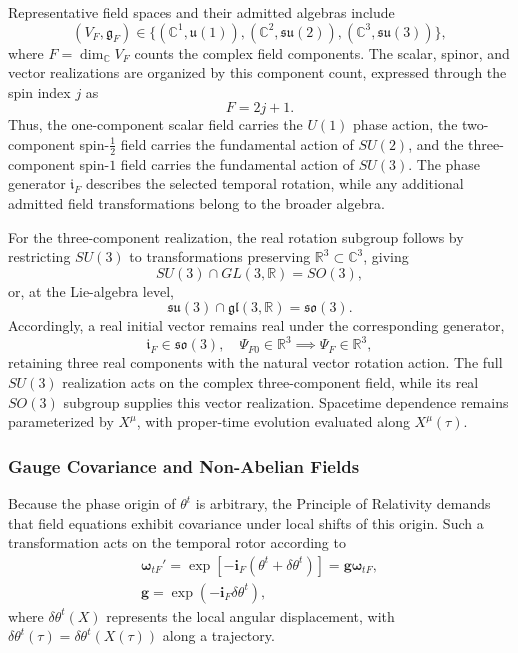 Representative field spaces and their admitted algebras include
\begin{equation}
    (V_{F},\mathfrak{g}_{F})\in\bigl\{(\mathbb{C}^{1},\mathfrak{u}(1)),(\mathbb{C}^{2},\mathfrak{su}(2)),(\mathbb{C}^{3},\mathfrak{su}(3))\bigr\},
\end{equation}
where $F=\dim_{\mathbb{C}}V_{F}$ counts the complex field components. The scalar, spinor, and vector realizations are organized by this component count, expressed through the spin index $j$ as
\begin{equation}
    F=2j+1.
\end{equation}
Thus, the one-component scalar field carries the $U(1)$ phase action, the two-component spin-$\frac{1}{2}$ field carries the fundamental action of $SU(2)$, and the three-component spin-$1$ field carries the fundamental action of $SU(3)$. The phase generator $\mathfrak{i}_{F}$ describes the selected temporal rotation, while any additional admitted field transformations belong to the broader algebra.

For the three-component realization, the real rotation subgroup follows by restricting $SU(3)$ to transformations preserving $\mathbb{R}^{3}\subset\mathbb{C}^{3}$, giving
\begin{equation}
    SU(3)\cap GL(3,\mathbb{R})=SO(3),
\end{equation}
or, at the Lie-algebra level,
\begin{equation}
    \mathfrak{su}(3)\cap\mathfrak{gl}(3,\mathbb{R})=\mathfrak{so}(3).
\end{equation}
Accordingly, a real initial vector remains real under the corresponding generator,
\begin{equation}
    \mathfrak{i}_{F}\in\mathfrak{so}(3),\quad\Psi_{F0}\in\mathbb{R}^{3}\implies\Psi_{F}\in\mathbb{R}^{3},
\end{equation}
retaining three real components with the natural vector rotation action. The full $SU(3)$ realization acts on the complex three-component field, while its real $SO(3)$ subgroup supplies this vector realization. Spacetime dependence remains parameterized by $X^{\mu}$, with proper-time evolution evaluated along $X^{\mu}(\tau)$.

\subsubsection{Gauge Covariance and Non-Abelian Fields}\label{ch_gauge_covariance}
Because the phase origin of $\theta^{t}$ is arbitrary, the Principle of Relativity demands that field equations exhibit covariance under local shifts of this origin. Such a transformation acts on the temporal rotor according to
\begin{equation}
\begin{gathered}
    \boldsymbol{\omega}_{tF}'=\exp[-\mathbf{i}_{F}(\theta^{t}+\delta\theta^{t})]=\mathbf{g}\boldsymbol{\omega}_{tF},\\
    \mathbf{g}=\exp(-\mathbf{i}_{F}\delta\theta^{t}),
\end{gathered}
\end{equation}
where $\delta\theta^{t}(X)$ represents the local angular displacement, with $\delta\theta^{t}(\tau)=\delta\theta^{t}(X(\tau))$ along a trajectory.

